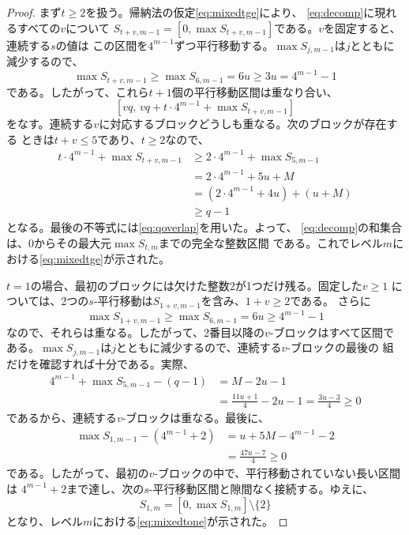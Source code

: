 \documentclass[12pt]{ltjsarticle}
\theoremstyle{plain}
\begin{document}
\begin{proof}
まず$t\geq2$を扱う。帰納法の仮定\eqref{eq:mixedtge}により、
\eqref{eq:decomp}に現れるすべての$v$について
$S_{t+v,m-1}=[0,\max S_{t+v,m-1}]$である。$v$を固定すると、連続する$s$の値は
この区間を$4^{m-1}$ずつ平行移動する。$\max S_{j,m-1}$は$j$とともに減少するので、
\[
 \max S_{t+v,m-1}\geq\max S_{6,m-1}=6u
     \geq3u=4^{m-1}-1
\]
である。したがって、これら$t+1$個の平行移動区間は重なり合い、
\[
 [vq,\,vq+t\cdot4^{m-1}+\max S_{t+v,m-1}]
\]
をなす。連続する$v$に対応するブロックどうしも重なる。次のブロックが存在する
ときは$t+v\leq5$であり、$t\geq2$なので、
\[
\begin{aligned}
 t\cdot4^{m-1}+\max S_{t+v,m-1}
 &\geq2\cdot4^{m-1}+\max S_{5,m-1}\\
 &=2\cdot4^{m-1}+5u+M\\
 &=(2\cdot4^{m-1}+4u)+(u+M)\\
 &\geq q-1
\end{aligned}
\]
となる。最後の不等式には\eqref{eq:qoverlap}を用いた。よって、
\eqref{eq:decomp}の和集合は、$0$からその最大元$\max S_{t,m}$までの完全な整数区間
である。これでレベル$m$における\eqref{eq:mixedtge}が示された。

$t=1$の場合、最初のブロックには欠けた整数$2$が1つだけ残る。固定した$v\geq1$
については、2つの$s$-平行移動は$S_{1+v,m-1}$を含み、$1+v\geq2$である。
さらに
\[
 \max S_{1+v,m-1}\geq\max S_{6,m-1}=6u\geq4^{m-1}-1
\]
なので、それらは重なる。したがって、2番目以降の$v$-ブロックはすべて区間で
ある。$\max S_{j,m-1}$は$j$とともに減少するので、連続する$v$-ブロックの最後の
組だけを確認すれば十分である。実際、
\[
\begin{aligned}
 4^{m-1}+\max S_{5,m-1}-(q-1)
 &=M-2u-1\\
 &=\frac{11u+1}{4}-2u-1
  =\frac{3u-3}{4}\geq0
\end{aligned}
\]
であるから、連続する$v$-ブロックは重なる。最後に、
\[
\begin{aligned}
 \max S_{1,m-1}-(4^{m-1}+2)
 &=u+5M-4^{m-1}-2\\
 &=\frac{47u-7}{4}\geq0
\end{aligned}
\]
である。したがって、最初の$v$-ブロックの中で、平行移動されていない長い区間は
$4^{m-1}+2$まで達し、次の$s$-平行移動区間と隙間なく接続する。ゆえに、
\[
 S_{1,m}=[0,\max S_{1,m}]\setminus\{2\}
\]
となり、レベル$m$における\eqref{eq:mixedtone}が示された。


\end{proof}
\end{document}
